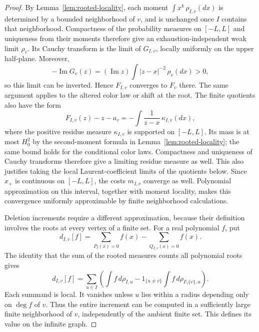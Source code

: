 \begin{proof}
By Lemma~\ref{lem:rooted-locality}, each moment
$\int x^k\,\rho_{I,v}(dx)$ is determined by a bounded neighborhood of $v$,
and is unchanged once $I$ contains that neighborhood.  Compactness of the
probability measures on $[-L,L]$ and uniqueness from their moments therefore
give an exhaustion-independent weak limit $\rho_v$.  Its Cauchy transform
is the limit of $G_{I,v}$, locally uniformly on the upper half-plane.
Moreover,
\[
 -\operatorname{Im}G_v(z)
   =(\operatorname{Im}z)\int |z-x|^{-2}\,\rho_v(dx)>0,
\]
so this limit can be inverted.  Hence $F_{I,v}$ converges to $F_v$ there.
The same argument applies to the altered color law or shift at the root.
The finite quotients also have the form
\[
 F_{I,v}(z)-z-a_v=-\int\frac{1}{z-x}\,\kappa_{I,v}(dx),
\]
where the positive residue measure $\kappa_{I,v}$ is supported on
$[-L,L]$.  Its mass is at most $H_0^2$ by the second-moment formula in
Lemma~\ref{lem:rooted-locality}; the same bound holds for the conditional
color laws.  Compactness and uniqueness of Cauchy transforms therefore
give a limiting residue measure as well.  This also justifies taking
the local Laurent-coefficient limits of the quotients below.
Since $x_+$ is continuous on $[-L,L]$, the costs $m_{I,v}$ converge as
well.  Polynomial approximation on this interval, together with moment
locality, makes this convergence uniformly approximable by finite
neighborhood calculations.

Deletion increments require a different approximation, because their
definition involves the roots at every vertex of a finite set.  For a real
polynomial $f$, put
\[
 d_{I,v}[f]=\sum_{P_I(x)=0}f(x)
              -\sum_{Q_{I,v}(x)=0}f(x).
\]
The identity that the sum of the rooted measures counts all polynomial roots
gives
\begin{equation}\label{inv:polynomial-increment}
 d_{I,v}[f]
 =\sum_{u\in I}\left(
       \int f\,d\rho_{I,u}
       -1_{\{u\ne v\}}\int f\,d\rho_{I\setminus\{v\},u}
                    \right).
\end{equation}
Each summand is local.  It vanishes unless $u$ lies within a radius depending
only on $\deg f$ of $v$.  Thus the entire increment can be computed in a
sufficiently large finite neighborhood of $v$, independently of the ambient
finite set.  This defines its value on the infinite graph.


\end{proof}
